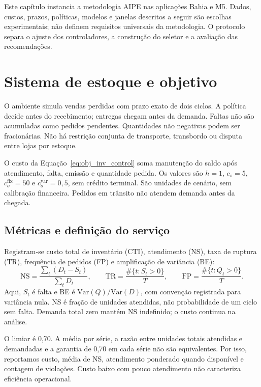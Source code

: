 
Este capítulo instancia a metodologia AIPE nas aplicações Bahia e M5. Dados, custos, prazos, políticas, modelos e janelas descritos a seguir são escolhas experimentais; não definem requisitos universais da metodologia. O protocolo separa o ajuste dos controladores, a construção do seletor e a avaliação das recomendações.

\section{Sistema de estoque e objetivo}
\label{sec:instanciacao_ambiente}\label{sec:ambiente_simulacao}
O ambiente simula vendas perdidas com prazo exato de dois ciclos. A política decide antes do recebimento; entregas chegam antes da demanda. Faltas não são acumuladas como pedidos pendentes. Quantidades não negativas podem ser fracionárias. Não há restrição conjunta de transporte, transbordo ou disputa entre lojas por estoque.

O custo da Equação~\ref{eq:obj_inv_control} soma manutenção do saldo após atendimento, falta, emissão e quantidade pedida. Os valores são $h=1$, $c_s=5$, $c_o^{\mathrm{fix}}=50$ e $c_o^{\mathrm{var}}=0{,}5$, sem crédito terminal. São unidades de cenário, sem calibração financeira. Pedidos em trânsito não atendem demanda antes da chegada.

\subsection{Métricas e definição do serviço}
\label{sec:metricas_avaliacao}
Registram-se custo total de inventário (CTI), atendimento (NS), taxa de ruptura (TR), frequência de pedidos (FP) e amplificação de variância (BE):
\[
 \mathrm{NS}=\frac{\sum_t(D_t-S_t)}{\sum_tD_t},\qquad
 \mathrm{TR}=\frac{\#\{t:S_t>0\}}T,\qquad
 \mathrm{FP}=\frac{\#\{t:Q_t>0\}}T.
\]
Aqui, $S_t$ é falta e BE é $\mathrm{Var}(Q)/\mathrm{Var}(D)$, com convenção registrada para variância nula. NS é fração de unidades atendidas, não probabilidade de um ciclo sem falta. Demanda total zero mantém NS indefinido; o custo continua na análise.

O limiar é 0,70. A média por série, a razão entre unidades totais atendidas e demandadas e a garantia de 0,70 em cada série não são equivalentes. Por isso, reportamos custo, média de NS, atendimento ponderado quando disponível e contagem de violações. Custo baixo com pouco atendimento não caracteriza eficiência operacional.

